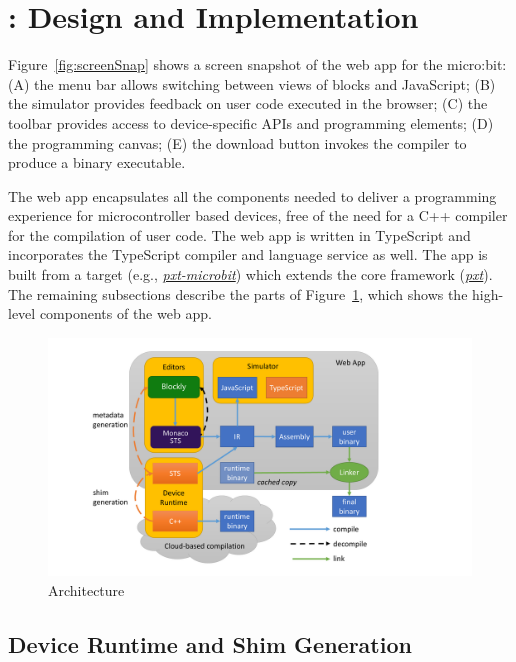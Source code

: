 \section{\MCN: Design and Implementation}
\label{sec:makecode}

Figure~\ref{fig:screenSnap} shows a screen snapshot of the \MC web app for the micro:bit: 
(A) the menu bar allows switching between views of blocks and JavaScript;
(B) the simulator provides feedback on user code executed in the browser;
(C) the toolbar provides access to device-specific APIs and programming elements;
(D) the programming canvas; 
(E) the download button invokes the compiler to produce a binary executable.

The \MC web app encapsulates all the components needed to deliver a programming experience 
for microcontroller based devices, free of the need for a C++ compiler for the compilation of user 
code.
The web app is written in TypeScript and incorporates the TypeScript compiler and 
language service as well. 
The app is built from a target (e.g., \emph{\href{https://github.com/microsoft/pxt-microbit}{pxt-microbit}})
which extends the core framework (\emph{\href{https://github.com/microsoft/pxt}{pxt}}).
The remaining subsections describe the parts of Figure~\ref{fig:makecode}, 
which shows the high-level components of the web app.

\begin{figure}[t]
    \includegraphics[width=5.5in]{makecodeFig.pdf}
\caption{\label{fig:makecode}\MC Architecture}
\end{figure}

\subsection{Device Runtime and Shim Generation}

